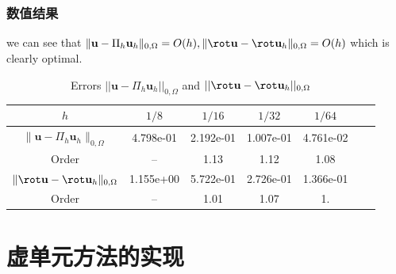 \documentclass[notheorems,serif]{beamer}
\begin{document}
\begin{frame}
    \frametitle{数值结果}
we can see that 
$\|\mathbf{u} - \Pi_h \mathbf{u}_h\|_{0,\Omega} = O(h), \|\rot \mathbf{u} -
\rot\mathbf{u}_h\|_{0,\Omega} = O(h)$ 
which is clearly optimal.
\begin{table}[!htp] 
\centering
\caption{Errors $||\mathbf{u} - \Pi_h \mathbf{u}_h||_{0,\Omega}$ and $||\rot
\mathbf{u} - \rot \mathbf{u}_h||_{0,\Omega}$ }
\label{tab:exm0}
\begin{tabular}[c]{|c|c|c|c|c|c|c|}\hline
$h$ & $1/8$ & $1/16$ & $1/32$ & $1/64$ 
\\\hline
$\|\mathbf{u} - \Pi_h{\mathbf{u}}_h \|_{0,\Omega}$ & 4.798e-01 & 2.192e-01 & 1.007e-01 & 4.761e-02 
\\\hline
Order & -- & 1.13 & 1.12 & 1.08 
\\\hline
$ \| \rot \mathbf{u} - \rot \mathbf{u}_h\|_{0,\Omega}$ & 1.155e+00 & 5.722e-01 & 2.726e-01 & 1.366e-01 
\\\hline
Order & -- & 1.01 & 1.07 & 1. 
\\\hline
\end{tabular}
\end{table} 


\end{frame}


\section{虚单元方法的实现}
\end{document}
